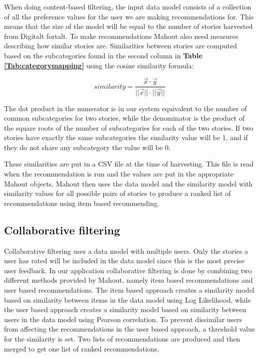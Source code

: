 When doing content-based filtering, the input data model consists of a collection of all the preference values for the user we are making recommendations for. This means that the size of the model will be equal to the number of stories harvested from Digitalt fortalt. To make recommendations Mahout also need measures describing how similar stories are. Similarities between stories are computed based on the subcategories found in the second column in \textbf{Table \ref{Tab:categorymapping}} using the cosine similarity formula: 

\begin{equation}
similarity = \frac{\vec{x}\cdot\vec{y}}{||\vec{x}||\cdot||\vec{y}||}
\end{equation}

The dot product in the numerator is in our system equivalent to the number of common subcategories for two stories, while the denominator is the product of the square roots of the number of subcategories for each of the two stories. If two stories have exactly the same subcategories the similarity value will be 1, and if they do not share any subcategory the value will be 0. \newline

These similarities are put in a CSV file at the time of harvesting. This file is read when the recommendation is run and the values are put in the appropriate Mahout objects. Mahout then uses the data model and the similarity model with similarity values for all possible pairs of stories to produce a ranked list of recommendations using item based recommending.


\subsection{Collaborative filtering}

Collaborative filtering uses a data model with multiple users. Only the stories a user has rated will be included in the data model since this is the most precise user feedback. In our application collaborative filtering is done by combining two different methods provided by Mahout, namely item based recommendations and user based recommendations. The item based approach creates a similarity model based on similarity between items in the data model using Log Likelihood, while the user based approach creates a similarity model based on similarity between users in the data model using Pearson correlation. To prevent dissimilar users from affecting the recommendations in the user based approach, a threshold value for the similarity is set. Two lists of recommendations are produced and then merged to get one list of ranked recommendations.\newline

